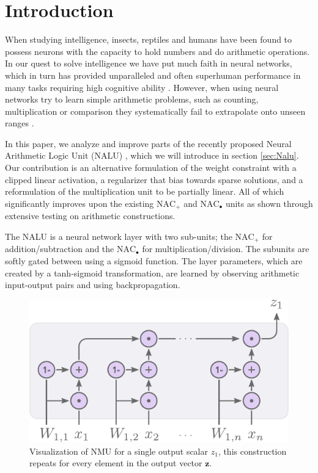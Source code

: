 \section{Introduction}
When studying intelligence, insects, reptiles and humans have been found to possess neurons with the capacity to hold numbers and do arithmetic operations\cite{nieder-neuronal-number,rugani-arithmetic-chicks,gallistel-numbers-in-brain}.
In our quest to solve intelligence we have put much faith in neural networks, which in turn has provided unparalleled and often superhuman performance in many tasks requiring high cognitive ability \cite{natureGo,googleNMT,resnet}.
However, when using neural networks try to learn simple arithmetic problems, such as counting, multiplication or comparison they systematically fail to extrapolate onto unseen ranges \cite{stillNotSystematic,suzgun2019evaluating,trask-nalu}.

In this paper, we analyze and improve parts of the recently proposed Neural Arithmetic Logic Unit (NALU) \cite{trask-nalu}, which we will introduce in section \ref{sec:Nalu}. Our contribution is an alternative formulation of the weight constraint with a clipped linear activation, a regularizer that bias towards sparse solutions, and a reformulation of the multiplication unit to be partially linear. All of which significantly improves upon the existing $\text{NAC}_{+}$ and $\text{NAC}_{\bullet}$ units as shown through extensive testing on arithmetic constructions.

The NALU is a neural network layer with two sub-units; the $\text{NAC}_{+}$ for addition/subtraction and the $\text{NAC}_{\bullet}$ for multiplication/division.
The subunits are softly gated between using a sigmoid function. The layer parameters, which are created by a tanh-sigmoid transformation, are learned by observing arithmetic input-output pairs and using backpropagation\cite{rumelhart1986learning}.
\begin{figure}[h]
\centering
\includegraphics[scale=0.6]{graphics/nmu.pdf}
\caption{Visualization of NMU for a single output scalar $z_1$, this construction repeats for every element in the output vector $\mathbf{z}$.}
\end{figure}

